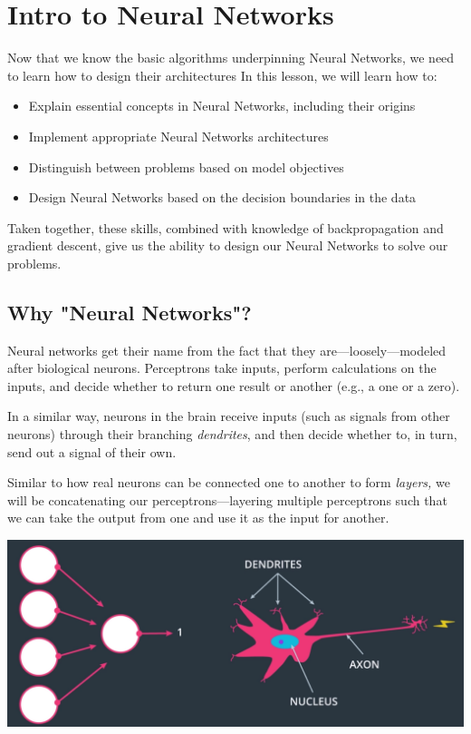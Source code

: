 \chapter{Intro to Neural Networks}

Now that we know the basic algorithms underpinning Neural Networks, we need to learn how to design their architectures In this lesson, we will learn how to:

\begin{itemize}
    \item Explain essential concepts in Neural Networks, including their origins
    \item Implement appropriate Neural Networks architectures
    \item Distinguish between problems based on model objectives
    \item Design Neural Networks based on the decision boundaries in the data
\end{itemize}
Taken together, these skills, combined with knowledge of backpropagation and gradient descent, give us the ability to design our Neural Networks to solve our problems.

\section{Why "Neural Networks"?}
Neural networks get their name from the fact that they are—loosely—modeled after biological neurons. Perceptrons take inputs, perform calculations on the inputs, and decide whether to return one result or another (e.g., a one or a zero).\newline

In a similar way, neurons in the brain receive inputs (such as signals from other neurons) through their branching \textit{dendrites}, and then decide whether to, in turn, send out a signal of their own.\newline

Similar to how real neurons can be connected one to another to form \textit{layers,} we will be concatenating our perceptrons—layering multiple perceptrons such that we can take the output from one and use it as the input for another.

\includegraphics[width=0.75\linewidth]{img//intro/introNN/image.png}


